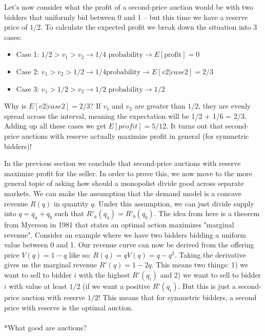\documentclass[
  letterpaper,
  DIV=11,
  numbers=noendperiod,
  oneside]{scrreprt}
\makeatletter
\let\oldparagraph\paragraph
\renewcommand{\paragraph}{
    \@ifstar
      \xxxParagraphStar
      \xxxParagraphNoStar
  }
\newcommand{\xxxParagraphStar}[1]{\oldparagraph*{#1}\mbox{}}
\newcommand{\xxxParagraphNoStar}[1]{\oldparagraph{#1}\mbox{}}
\theoremstyle{remark}
\makeatother
\begin{document}
Let's now consider what the profit of a second-price auction would be
with two bidders that uniformly bid between 0 and 1 -- but this time we
have a reserve price of \(1/2\). To calculate the expected profit we
break down the situation into 3 cases:

\begin{itemize}
\item
  Case 1:
  \(1/2 > v_1 > v_2 \rightarrow 1/4 \text{ probability} \rightarrow  E[\text{profit}] = 0\)
\item
  Case 2:
  \(v_1 > v_2 > 1/2 \rightarrow 1/4 \text{probability} \rightarrow E[v2 | case 2] = 2/3\)
\item
  Case 3:
  \(v_1 > 1/2 > v_2 \rightarrow 1/2 \text{ probability} \rightarrow 1/2\)
\end{itemize}

Why is \(E[v2 | case 2] = 2/3\)? If \(v_1\) and \(v_2\) are greater than
\(1/2\), they are evenly spread across the interval, meaning the
expectation will be 1/2 + 1/6 = 2/3. Adding up all these cases we get
\(E[profit] = 5/12\). It turns out that second-price auctions with
reserve actually maximize profit in general (for symmetric bidders)!

In the previous section we conclude that second-price auctions with
reserve maximize profit for the seller. In order to prove this, we now
move to the more general topic of asking how should a monopolist divide
good across separate markets. We can make the assumption that the demand
model is a concave revenue \(R(q)\) in quantity \(q\). Under this
assumption, we can just divide supply into \(q = q_a + q_b\) such that
\(R'_a(q_a) = R'_b(q_b)\). The idea from here is a theorem from Myerson
in 1981 that states an optimal action maximizes "marginal revenue".
Consider an example where we have two bidders bidding a uniform value
between 0 and 1. Our revenue curve can now be derived from the offering
price \(V(q) = 1 - q\) like so: \(R(q) = qV(q) = q - q^2\). Taking the
derivative gives us the marginal revenue \(R'(q) = 1-2q\). This means
two things: 1) we want to sell to bidder \(i\) with the highest
\(R'(q_i)\) and 2) we want to sell to bidder \(i\) with value at least
\(1/2\) (if we want a positive \(R'(q_i)\). But this is just a
second-price auction with reserve \(1/2\)! This means that for symmetric
bidders, a second price with reserve is the optimal auction.

\paragraph*{What good are auctions?}\label{what-good-are-auctions}
\end{document}
